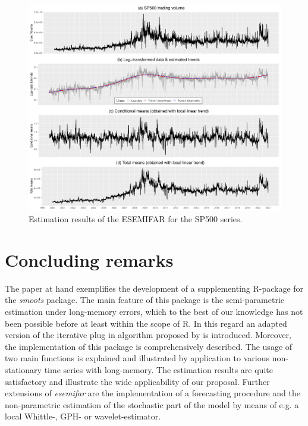 \documentclass[12pt]{article}
\begin{document}
 
 \begin{figure}[h!]
 	\includegraphics[trim = {0cm 0mm 0mm 0mm}, width = \textwidth]{Abb/SP500VOL.pdf}
 	\caption{Estimation results of the ESEMIFAR for the SP500 series.}
 \end{figure}


\section{Concluding remarks}
The paper at hand exemplifies the development of a supplementing R-package for the \textit{smoots} package. The main feature of this package is the semi-parametric estimation under long-memory errors, which to the best of our knowledge has not been possible before at least within the scope of R. In this regard an adapted version of the iterative plug in algorithm proposed by \citet{beran2002iterative} is introduced. Moreover, the implementation of this package is comprehensively described. The usage of two main functions is explained and illustrated by application to various non-stationary time series with long-memory. The estimation results are quite satisfactory and illustrate the wide applicability of our proposal. Further extensions of \textit{esemifar} are the implementation of a forecasting procedure and the non-parametric estimation of the stochastic part of the model by means of e.g.  a local Whittle-, GPH- or wavelet-estimator.

\clearpage

\printbibliography


\clearpage
\end{document}
